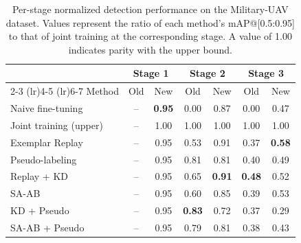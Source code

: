 \begin{table}[t]
\centering
\caption{Per-stage normalized detection performance on the Military-UAV
dataset. Values represent the ratio of each method's mAP@[0.5:0.95] to that
of joint training at the corresponding stage. A value of 1.00 indicates
parity with the upper bound.}
\label{tab:military-oldnew}
\begin{tabular}{l cc cc cc}
\toprule
& \multicolumn{2}{c}{Stage 1} & \multicolumn{2}{c}{Stage 2} & \multicolumn{2}{c}{Stage 3} \\
\cmidrule(lr){2-3} \cmidrule(lr){4-5} \cmidrule(lr){6-7}
Method & Old & New & Old & New & Old & New \\
\midrule
  Naive fine-tuning          & -- & \textbf{0.95} & 0.00 & 0.87 & 0.00 & 0.47 \\
  Joint training (upper)     & -- & 1.00 & 1.00 & 1.00 & 1.00 & 1.00 \\
  \midrule
  Exemplar Replay            & -- & 0.95 & 0.53 & 0.91 & 0.37 & \textbf{0.58} \\
  Pseudo-labeling            & -- & 0.95 & 0.81 & 0.81 & 0.40 & 0.49 \\
  Replay + KD                & -- & 0.95 & 0.65 & \textbf{0.91} & \textbf{0.48} & 0.52 \\
  SA-AB                      & -- & 0.95 & 0.60 & 0.85 & 0.39 & 0.53 \\
  \midrule
  KD + Pseudo                & -- & 0.95 & \textbf{0.83} & 0.72 & 0.37 & 0.29 \\
  SA-AB + Pseudo             & -- & 0.95 & 0.79 & 0.81 & 0.38 & 0.43 \\
\bottomrule
\end{tabular}
\end{table}

